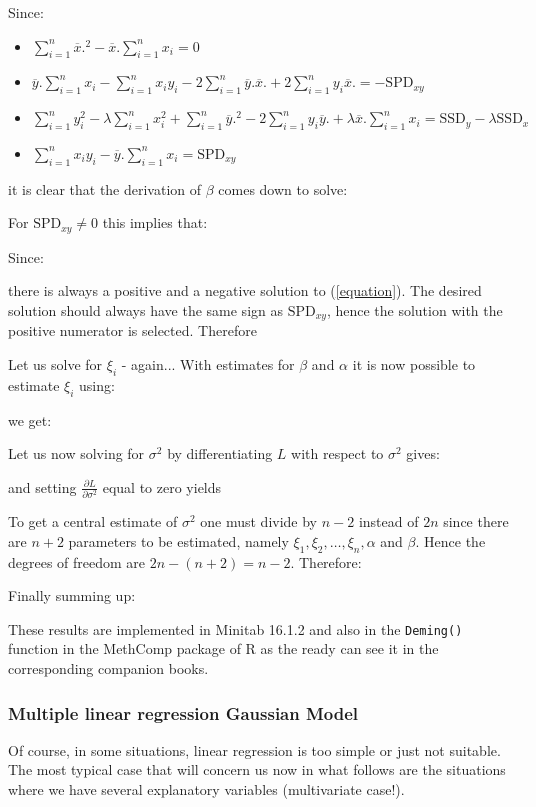 	Since:
	\begin{itemize}
		\item
		$\displaystyle\sum_{i=1}^n\overline{x}.^2
		-\overline{x}.\displaystyle\sum_{i=1}^nx_i=0$
		\item
		$\overline{y}.\displaystyle\sum_{i=1}^nx_i
		-\displaystyle\sum_{i=1}^nx_iy_i
		-2\displaystyle\sum_{i=1}^n\overline{y}.\overline{x}.
		+2\displaystyle\sum_{i=1}^ny_i\overline{x}.=-\text{SPD}_{xy}$
		\item
		$\displaystyle\sum_{i=1}^ny_i^2
		-\lambda\displaystyle\sum_{i=1}^nx_i^2
		+\displaystyle\sum_{i=1}^n\overline{y}.^2
		-2\displaystyle\sum_{i=1}^ny_i\overline{y}.
		+\lambda\overline{x}.\displaystyle\sum_{i=1}^nx_i
		=\text{SSD}_y-\lambda\text{SSD}_x$
		\item
		$\displaystyle\sum_{i=1}^nx_iy_i
		-\overline{y}.\displaystyle\sum_{i=1}^nx_i=\text{SPD}_{xy}$
	\end{itemize}
	it is clear that the derivation of $\beta$ comes down to solve:
	
	For $\text{SPD}_{xy}\neq 0$ this implies that:
	
	Since:
	
	there is always a positive and a negative solution to (\ref{equation}). The desired solution should always have the same sign as $\text{SPD}_{xy}$, hence the solution with the positive numerator is selected. Therefore
	

	Let us solve for $\xi_i$ - again... With estimates for $\beta$ and $\alpha$ it is now possible to estimate $\xi_i$ using:
	
	we get:
	

	Let us now solving for $\sigma^2$ by differentiating $L$ with respect to $\sigma^2$ gives:
	
	and setting $\frac{\partial L}{\partial \sigma^2}$ equal to zero yields
	
	To get a central estimate of $\sigma^2$ one must divide by $n-2$
instead of $2n$ since there are $n+2$ parameters to be estimated,
namely $\xi_1,\xi_2,\ldots,\xi_n,\alpha$ and $\beta$. Hence the
degrees of freedom are $2n-(n+2)=n-2$. Therefore:
	
	Finally summing up:
	
	These results are implemented in Minitab 16.1.2 and also in the \texttt{Deming()} function in the MethComp package of R as the ready can see it in the corresponding companion books.

	\subsubsection{Multiple linear regression Gaussian Model}
	Of course, in some situations, linear regression is too simple or just not suitable. The most typical case that will concern us now in what follows are the situations where we have several explanatory variables (multivariate case!).
	
